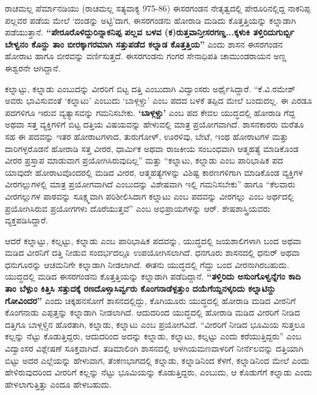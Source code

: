 ರಾಚಮಲ್ಲ ಪೆರ್ಮಾನಡಿಯು (ರಾಚಮಲ್ಲ ಸತ್ಯವಾಕ್ಯ 975-86) ಈಸರಗಂಡನ ನೇತೃತ್ವದಲ್ಲಿ ಪೇರೂರಿನಲ್ಲಿದ್ದ ನಾಕನಿಪ್ಪ ಪಲ್ಲವರ ಪಡೆಯ ಮೇಲೆ ‘ದಂಡನ್ನು ಅಟ್ಟಿ’ದಾಗ, ಈಸರಗಂಡನು ಹೋರಾಡಿ ಮಡಿದು ಕೊತ್ತತ್ತಿಯನ್ನು ಕಲ್ನಾಡಾಗಿ ಪಡೆಯುತ್ತಾನೆ. \textbf{“ಪೇರೂರೊಳಿದ್ದುರಿನ್ನಾಕನಿಪ್ಪ ಪಲ್ಲವ ಬಳವ (ಕ)ರುತ್ತವಾನ್ತೀಸರಗಣ್ಡ...ಕ್ಕಳುಕಿ ತಳ್ತಿರಿದುಗುರ್ಬ್ಬಿ ಬೇಳ್ವನಂ ಕೊನ್ದು ತಾಂ ಬೀರಕ್ಕಾಗರಮಾಗಿ ಸತ್ತುಪಡೆದ ಕಲ್ನಾಡ ಕೊತ್ತತ್ತಿಯ”} ಎಂದು ಶಾಸನ ಈಸರಗಂಡನ ಹೋರಾಟ ಹಾಗೂ ಬೀರವನ್ನು ವರ್ಣಿಸುತ್ತದೆ. ಈಸರಗಂಡನು ಗಂಗರ ಸೇನಾಧಿಪತಿ ಚಾಮುಂಡರಾಯನ ಅಣ್ಣ ಈಶ್ವರನೇ ಆಗಿದ್ದಾನೆ.

ಕಲ್ನಾಟ್ಟು, ಕಲ್ನಾಡು ಎಂಬುದನ್ನು ವೀರರಿಗೆ ಬಿಟ್ಟ ದತ್ತಿ ಎಂಬುದಾಗಿ ವಿದ್ವಾಂಸರು ಅರ್ಥೈಸಿದ್ದಾರೆ. “ಕೆ.ವಿ.ರಮೇಶ್​ ಅವರು ಭಾವಿಸುವಂತೆ ‘ಕಲ್ನಾಟು’ ಎಂಬುದು ‘ಬಾಳ್ಗಳ್ಚು’ ಎಂಬ ಪದದ ಬಳಕೆ ತಪ್ಪಿದ ಮೇಲೆ ಬಂದುದಲ್ಲ. ಈ ಎರಡೂ ಪದಗಳಿಗೂ ಇರುವ ವ್ಯತ್ಯಾಸವನ್ನು ಗಮನಿಸಬೇಕು. \textbf{‘ಬಾಳ್ಗಳ್ಚು’} ಎಂಬ ಪದ ಕೇವಲ ಯುದ್ಧದಲ್ಲಿ ಹೋರಾಡಿ ಗೆದ್ದ ಅಥವಾ ಸತ್ತ ವ್ಯಕ್ತಿಗಳಿಗೆ ಬಿಟ್ಟ ದತ್ತಿಯ ವಿಷಯವನ್ನು ಹೇಳುವಲ್ಲಿ ಮಾತ್ರ ಪ್ರಯೋಗವಾಗಿದೆ. ಶಾಸನಕಾರರು ಮರೆತೂ ಸಹ ಈ ಪದವನ್ನು ಇತರ ಹೋರಾಟಗಳಾದ, ತುರುಗೋಳ್​, ಊರಳಿವು, ಬೇಟೆ, ಇಂಥ ಹೋರಾಟಗಳ ಮತ್ತು ದಾರಿಗಳ್ಳರೊಡನೆ ಹೋರಾಡಿ ಸತ್ತ ವೀರರ, ಧಾರ್ಮಿಕ ಅಥವಾ ರಾಜಕೀಯ ಸಂಬಂಧವಾಗಿ ಆತ್ಮಹತ್ಯೆ ಮಾಡಿಕೊಂಡ ವೀರರ ಪ್ರಸ್ತಾಪ ಮಾಡುವಾಗ ಪ್ರಯೋಗಿಸಿರುವುದಿಲ್ಲ” ಮತ್ತು “ಕಲ್ನಾಟು, ಕಲ್ನಾಡು ಎಂಬ ಪಾರಿಭಾಷಿಕ ಪದ ಯಾವುದೇ ಹೋರಾಟವೊಂದರಲ್ಲಿ ಮಡಿದ ವೀರರ, ಆತ್ಮಹತ್ಯೆಗಳನ್ನು ವಿಶಿಷ್ಟ ಕಾರಣಗಳಿಗಾಗಿ ಮಾಡಿಕೊಂಡ ವ್ಯಕ್ತಿಗಳ ವೀರಗಲ್ಲುಗಳಲ್ಲಿ ಮಾತ್ರ ಪ್ರಯೋಗವಾಗಿದೆ ಎಂಬುದನ್ನು ವಿಶೇಷವಾಗಿ ಇಲ್ಲಿ ಗಮನಿಸಬೇಕು” ಹಾಗೂ “ಕೆಲವಾರು ವೀರಗಲ್ಲುಗಳ ಪಾಠವನ್ನು ಸೂಕ್ಷ್ಮವಾಗಿ ಪರಿಶೀಲಿಸಿದಾಗ ಕಲ್ನಾಟು ಎಂಬ ಪದವನ್ನು ವೀರಗಲ್ಲು ಎಂಬ ಅರ್ಥದಲ್ಲಿ ಪ್ರಯೋಗಿಸಿರುವ ಪ್ರಯೋಗಗಳು ದೊರೆಯುತ್ತವೆ” ಎಂಬ ಅಭಿಪ್ರಾಯಗಳನ್ನು ಆರ್​. ಶೇಷಶಾಸ್ತ್ರಿಯವರು ವ್ಯಕ್ತಪಡಿಸಿದ್ದಾರೆ.

ಆದರೆ ಕಲ್ನಾಟ್ಟು, ಕಲ್ನಟ್ಟು, ಕಲ್ನಾಡು ಎಂಬ ಪಾರಿಭಾಷಿಕ ಪದವನ್ನು, ಯುದ್ಧದಲ್ಲಿ ಜಯಶಾಲಿಗಳಾಗಿ ಬಂದ ಅಥವಾ ಮಡಿದ ವೀರನಿಗೆ ದತ್ತಿ ನೀಡುವ ಸಂದರ್ಭದಲ್ಲೂ ಉಪಯೋಗಿಸಲಾಗಿದೆ. ಧನಗೂರು ಶಾಸನದಲ್ಲಿ ಧನುರ್​ ಅಥವಾ ಧನುಗೂರನ್ನು ಆಚಮನಿಗೇ ಕಲ್ನಾಡಾಗಿ ನೀಡಲಾಗಿದೆ. ಈತನು ಯುದ್ಧದಲ್ಲಿ ಗೆದ್ದು ಬಂದ ವೀರನಾಗಿರಬಹುದು. ಯುದ್ಧದಲ್ಲಿ ಮಡಿದ ಈಸರಗಂಡನು ಕೊತ್ತತ್ತಿಯನ್ನು ಕಲ್ನಾಡಾಗಿ ಪಡೆದಿದ್ದಾನೆ. \textbf{“ತಳ್ತಿರಿದು ಅಸುಂಗೊಳ್ವನ್ನೆಗಂ ಕಾದಿ ತಾಂ ಬೆಳ್ಪುಂ ಕಿತ್ತಿಸಿ ಸತ್ತುದಕ್ಕೆ ರಣದೊಳ್ಸಾಸಿರ್ವ್ವರು ಕೊಂಗನಾಡೆಳ್ಪತ್ತುಂ ದಯೆಗೆಯ್ದನಳ್ಕರಿದು ಕಲ್ನಾಟಿನ್ದು ಗೋವಿಂದರ”} ಎಂದು ಚಿಕ್ಕಹನಸೋಗೆ ಶಾಸನದಲ್ಲಿದ್ದು, ಕೊಗಿಯೂರು ಯುದ್ಧದಲ್ಲಿ ಹೋರಾಡಿ ಮಡಿದ ವೀರನಿಗೆ ಕೊಂಗನಾಡು ಎಪ್ಪತ್ತನ್ನು ಕಲ್ನಾಡಾಗಿ ನೀಡಲಾಗಿದೆ. ಆದುದರಿಂದ ಯುದ್ಧದಲ್ಲಿ ಹೋರಾಡಿ ಮಡಿದ ವೀರರಿಗೆ ನೀಡಿದ ದತ್ತಿಗೂ ಬಾಳ್ಗಳ್ಚಿನ ಹೊರತಾಗಿ, ಕಲ್ನಾಡು, ಕಲ್ನಾಟು ಎಂಬ ಪ್ರಯೋಗವಿದೆ. “ವೀರರಿಗೆ ನೀಡಿದ ಭೂಮಿಯ ಸುತ್ತಲೂ ಕಲ್ಲನ್ನು ನೆಟ್ಟು ಕೊಡುತ್ತಿದ್ದರು, ಆದುದರಿಂದ ಅದನ್ನು ಕಲ್ನಾಡು, ಕಲ್ನಾಟು, ಕಲ್ನಟ್ಟು ಎಂದು ಕರೆಯುತ್ತಿದ್ದರು” ಎಂಬ ವಿದ್ವಾಂಸರ ವಿಶ್ಲೇಷಣೆ ಸೂಕ್ತವಾಗಿದೆ. ತಡಿಮಾಲಿಂಗಿ ಶಾಸನದಲ್ಲಿ ಅಳಗಿಯಮಣವಾಳರಿಗೆ ನೀರ್ನೆಲವನ್ನು ದತ್ತಿಯಾಗಿ ಬಿಟ್ಟು ಅದರ ಎಲ್ಲೆಯನ್ನು ಹೇಳುವಾಗ, ತೆಂಕಣಭಾಗದಲ್ಲಿ ಕಲ್ನಾಡು, ಕಲ್ನಾಡಿನಿಂದ ಕೆಳಗೆ, ಕಲ್ನಾಡಿನಿಂದ ಮೇಲೆ ಎಂದು ಹೇಳಿರುವುದರಿಂದ ವೀರರಿಗೆ ಕಲ್ಲನ್ನು ನೆಟ್ಟು ಭೂಮಿಯನ್ನು ಕೊಡುತ್ತಿದ್ದರು, ಎಂಬುದು, ಆ ಕೊಡುಗೆಗೆ ಕಲ್ನಾಡು ಎಂದು ಹೇಳಲಾಗುತ್ತಿತ್ತು ಎಂದೂ ಹೇಳಬಹುದು.


